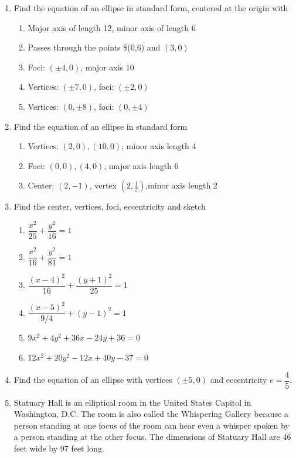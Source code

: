 \documentclass[
]{article}
\providecommand{\tightlist}{%
  \setlength{\itemsep}{0pt}\setlength{\parskip}{0pt}}
\def\tightlist{}
\begin{document}
\begin{enumerate}
\tightlist
\item
  Find the equation of an ellipse in standard form, centered at the
  origin with

  \begin{enumerate}
  \tightlist
  \item
    Major axis of length 12, minor axis of length 6
  \item
    Passes through the points \$(0,6) and \((3,0)\)
  \item
    Foci: \((\pm 4,0)\), major axis 10
  \item
    Vertices: \((\pm 7,0)\), foci: \((\pm 2,0)\)
  \item
    Vertices: \((0, \pm 8)\), foci: \((0, \pm 4)\)
  \end{enumerate}
\item
  Find the equation of an ellipse in standard form

  \begin{enumerate}
  \tightlist
  \item
    Vertices: \((2,0), (10,0)\); minor axis length 4
  \item
    Foci: \((0,0), (4,0)\), major axis length 6
  \item
    Center: \((2,-1)\), vertex \((2,\frac12)\),minor axis length 2
  \end{enumerate}
\item
  Find the center, vertices, foci, eccentricity and sketch

  \begin{enumerate}
  \tightlist
  \item
    \(\dfrac{x^2}{25} + \dfrac{y^2}{16} = 1\)
  \item
    \(\dfrac{x^2}{16} + \dfrac{y^2}{81} = 1\)
  \item
    \(\dfrac{(x-4)^2}{16} + \dfrac{(y+1)^2}{25} = 1\)
  \item
    \(\dfrac{(x-5)^2}{9/4} + (y-1)^2 = 1\)
  \item
    \(9x^2 + 4y^2 + 36x - 24y + 36 = 0\)
  \item
    \(12x^2 + 20y^2 - 12x + 40y - 37 = 0\)
  \end{enumerate}
\item
  Find the equation of an ellipse with vertices \((\pm 5,0)\) and
  eccentricity \(e = \dfrac{4}{5}\).
\item
  Statuary Hall is an elliptical room in the United States Capitol in
  Washington, D.C. The room is also called the Whispering Gallery
  because a person standing at one focus of the room can hear even a
  whisper spoken by a person standing at the other focus. The dimensions
  of Statuary Hall are 46 feet wide by 97 feet long.


\end{enumerate}
\end{document}
